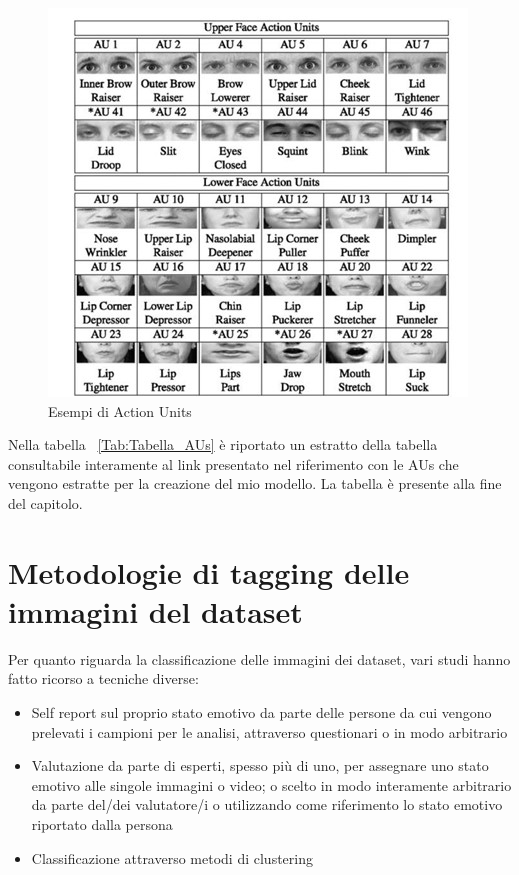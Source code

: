 \begin{figure}
    \begin{center}    
        \includegraphics[width=1\linewidth]{images/10.jpg}
        \caption{Esempi di Action Units}
    \end{center}
\end{figure}

\newpage

Nella tabella ~\ref{Tab:Tabella_AUs} è riportato un estratto della tabella consultabile interamente al link presentato nel riferimento \cite{PyFeat} con le AUs che vengono estratte per la creazione del mio modello. La tabella è presente alla fine del capitolo.

\newpage

\section{Metodologie di tagging delle immagini del dataset}
Per quanto riguarda la classificazione delle immagini dei dataset, vari studi hanno fatto ricorso a tecniche diverse:
\begin{itemize}
    \item Self report sul proprio stato emotivo da parte delle persone da cui vengono prelevati i campioni per le analisi, attraverso questionari o in modo arbitrario
    \item Valutazione da parte di esperti, spesso più di uno, per assegnare uno stato emotivo alle singole immagini o video; o scelto in modo interamente arbitrario da parte del/dei valutatore/i o utilizzando come riferimento lo stato emotivo riportato dalla persona
    \item Classificazione attraverso metodi di clustering \cite{FacialExpresRecLocalBinaryPatt}
\end{itemize}

